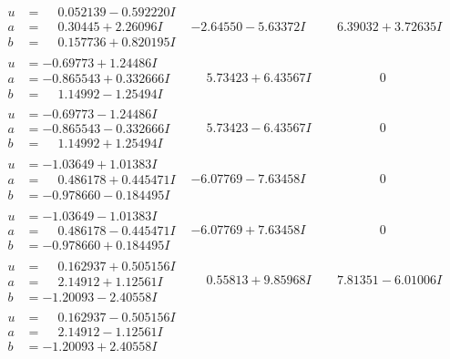 \documentclass[1p]{elsarticle_modified}
\theoremstyle{definition}
\begin{document}
$$\begin{array}{c|c|c}
\begin{aligned}
u &= \phantom{-}0.052139 - 0.592220 I \\
a &= \phantom{-}0.30445 + 2.26096 I \\
b &= \phantom{-}0.157736 + 0.820195 I\end{aligned}
 & -2.64550 - 5.63372 I & \phantom{-}6.39032 + 3.72635 I \\ \hline\begin{aligned}
u &= -0.69773 + 1.24486 I \\
a &= -0.865543 + 0.332666 I \\
b &= \phantom{-}1.14992 - 1.25494 I\end{aligned}
 & \phantom{-}5.73423 + 6.43567 I & \phantom{-0.000000 } 0 \\ \hline\begin{aligned}
u &= -0.69773 - 1.24486 I \\
a &= -0.865543 - 0.332666 I \\
b &= \phantom{-}1.14992 + 1.25494 I\end{aligned}
 & \phantom{-}5.73423 - 6.43567 I & \phantom{-0.000000 } 0 \\ \hline\begin{aligned}
u &= -1.03649 + 1.01383 I \\
a &= \phantom{-}0.486178 + 0.445471 I \\
b &= -0.978660 - 0.184495 I\end{aligned}
 & -6.07769 - 7.63458 I & \phantom{-0.000000 } 0 \\ \hline\begin{aligned}
u &= -1.03649 - 1.01383 I \\
a &= \phantom{-}0.486178 - 0.445471 I \\
b &= -0.978660 + 0.184495 I\end{aligned}
 & -6.07769 + 7.63458 I & \phantom{-0.000000 } 0 \\ \hline\begin{aligned}
u &= \phantom{-}0.162937 + 0.505156 I \\
a &= \phantom{-}2.14912 + 1.12561 I \\
b &= -1.20093 - 2.40558 I\end{aligned}
 & \phantom{-}0.55813 + 9.85968 I & \phantom{-}7.81351 - 6.01006 I \\ \hline\begin{aligned}
u &= \phantom{-}0.162937 - 0.505156 I \\
a &= \phantom{-}2.14912 - 1.12561 I \\
b &= -1.20093 + 2.40558 I\end{aligned}

\end{array}$$
\end{document}
